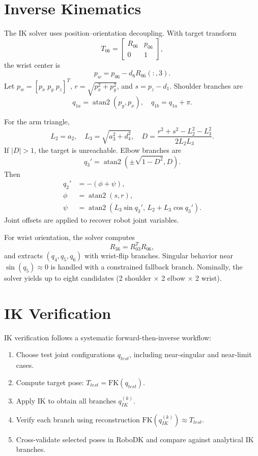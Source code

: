 \documentclass[conference]{IEEEtran}
\begin{document}
\section{Inverse Kinematics}
The IK solver uses position--orientation decoupling. With target transform
\begin{equation}
T_{06}=\begin{bmatrix}R_{06} & p_{06} \\ 0 & 1\end{bmatrix},
\end{equation}
the wrist center is
\begin{equation}
p_w = p_{06} - d_6 R_{06}(:,3).
\end{equation}
Let $p_w=[p_x\;p_y\;p_z]^T$, $r=\sqrt{p_x^2+p_y^2}$, and $s=p_z-d_1$.
Shoulder branches are
\begin{equation}
q_{1a}=\operatorname{atan2}(p_y,p_x),\quad q_{1b}=q_{1a}+\pi.
\end{equation}

For the arm triangle,
\begin{equation}
L_2=a_2,\quad L_3=\sqrt{a_3^2+d_4^2},\quad
D=\frac{r^2+s^2-L_2^2-L_3^2}{2L_2L_3}.
\end{equation}
If $|D|>1$, the target is unreachable. Elbow branches are
\begin{equation}
q_3' = \operatorname{atan2}(\pm\sqrt{1-D^2},D).
\end{equation}
Then
\begin{align}
q_2' &= -(\phi+\psi), \\
\phi &= \operatorname{atan2}(s,r), \\
\psi &= \operatorname{atan2}\!\left(L_3\sin q_3',\,L_2+L_3\cos q_3'\right).
\end{align}
Joint offsets are applied to recover robot joint variables.

For wrist orientation, the solver computes
\begin{equation}
R_{36}=R_{03}^T R_{06},
\end{equation}
and extracts $(q_4,q_5,q_6)$ with wrist-flip branches. Singular behavior near $\sin(q_5)\approx 0$ is handled with a constrained fallback branch. Nominally, the solver yields up to eight candidates (2 shoulder $\times$ 2 elbow $\times$ 2 wrist).

\section{IK Verification}
IK verification follows a systematic forward-then-inverse workflow:
\begin{enumerate}
    \item Choose test joint configurations $q_{test}$, including near-singular and near-limit cases.
    \item Compute target pose: $T_{test}=\mathrm{FK}(q_{test})$.
    \item Apply IK to obtain all branches $q_{IK}^{(k)}$.
    \item Verify each branch using reconstruction $\mathrm{FK}(q_{IK}^{(k)})\approx T_{test}$.
    \item Cross-validate selected poses in RoboDK and compare against analytical IK branches.
\end{enumerate}
\end{document}
